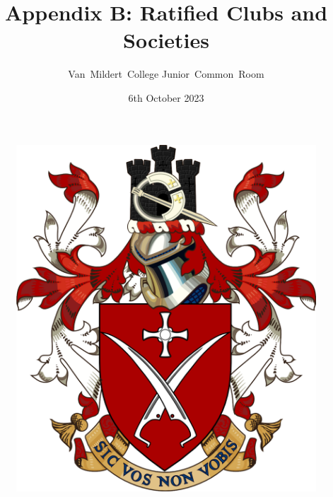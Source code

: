 \documentclass[12pt]{article}  %
\title{Appendix B: Ratified Clubs and Societies}
\author{Van~Mildert~College Junior~Common~Room}
\date{6th October 2023}
\begin{document}
\begin{titlepage}  %
\maketitle
\begin{figure}[h]
\includegraphics[scale=0.25]{arms}  %
\centering
\end{figure}
\thispagestyle{empty}
\end{titlepage}
\setcounter{page}{2}  %
\end{document}
